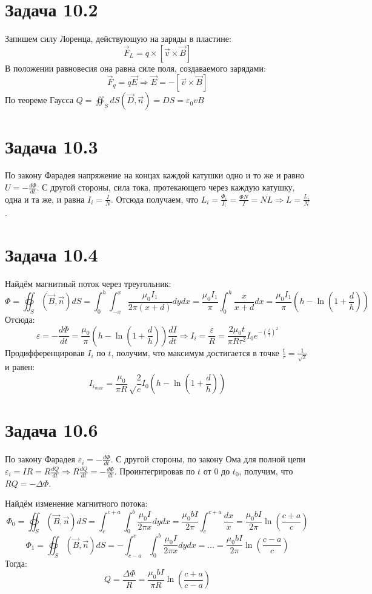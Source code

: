 \documentclass[11pt]{article}
\author{Sergey Makarov}
\date{\today}
\title{}
\begin{document}
\section{Задача 10.2}
\label{sec:org1e35823}
Запишем силу Лоренца, действующую на заряды в пластине:
$$\vec F_{L} = q \times [\vec v \times \vec B]$$
В положении равновесия она равна силе поля, создаваемого зарядами:
$$\vec F_q = q\vec E \Rightarrow \vec E = -[\vec v \times \vec B]$$
По теореме Гаусса \(Q = \oiint_SdS (\vec D, \vec n) = DS = \varepsilon_0vB\)
\section{Задача 10.3}
\label{sec:orge43d497}
По закону Фарадея напряжение на концах каждой катушки одно и то же и равно \(U = -\frac{d\Phi}{dt}\).
С другой стороны, сила тока, протекающего через каждую катушку, одна и та же, и равна \(I_i = \frac{I}{N}\).
Отсюда получаем, что \(L_i = \frac{\Phi_i}{I_i} = \frac{\Phi N}{I} = NL \Rightarrow L = \frac{L_i}{N}\).
\section{Задача 10.4}
\label{sec:orgbf37fa8}
Найдём магнитный поток через треугольник:
$$\Phi = \oiint_S (\vec B, \vec n)dS = \int_0^h \int_{-x}^x \frac{\mu_0 I_1}{2\pi(x + d)}dydx = \frac{\mu_0 I_1}{\pi}\int_0^h \frac{x}{x + d}dx = \frac{\mu_0 I_1}{\pi}\left(h - \ln\left(1 + \frac{d}{h}\right)\right)$$
Отсюда:
$$\varepsilon = -\frac{d\Phi}{dt} = \frac{\mu_0}{\pi}\left(h - \ln\left(1 + \frac{d}{h}\right)\right)\frac{dI}{dt} \Rightarrow I_{i} = \frac{\varepsilon}{R} = \frac{2\mu_0t}{\pi R\tau^2}I_0e^{-\left(\frac{t}{\tau}\right)^2}$$
Продифференцировав \(I_i\) по \(t\), получим, что максимум достигается в точке \(\frac{t}{\tau} = \frac{1}{\sqrt 2}\) и равен:
$$I_{i_{max}} = \frac{\mu_0}{\pi R}\sqrt \frac{2}{e} I_0\left(h - \ln\left(1 + \frac{d}{h}\right)\right)$$
\section{Задача 10.6}
\label{sec:org720c0a1}
По закону Фарадея \(\varepsilon_i = -\frac{d\Phi}{dt}\). С другой стороны, по закону Ома для полной цепи \(\varepsilon_i = IR = R\frac{dQ}{dt} \Rightarrow R\frac{dQ}{dt} = -\frac{d\Phi}{dt}\). Проинтегрировав по \(t\) от \(0\) до \(t_0\), получим, что \(RQ = -\Delta\Phi\).

Найдём изменение магнитного потока:
$$\Phi_0 = \oiint_S (\vec B, \vec n)dS = \int_c^{c + a} \int_0^b \frac{\mu_0 I}{2\pi x}dydx = \frac{\mu_0 bI}{2\pi}\int_c^{c + a} \frac{dx}{x} = \frac{\mu_0 bI}{2\pi}\ln\left(\frac{c + a}{c}\right)$$
$$\Phi_1 = \oiint_S (\vec B, \vec n)dS = -\int_{c - a}^c \int_0^b \frac{\mu_0 I}{2\pi x}dydx = \ldots = \frac{\mu_0 bI}{2\pi}\ln\left(\frac{c - a}{c}\right)$$
Тогда:
$$Q = \frac{\Delta\Phi}{R} = \frac{\mu_0 bI}{\pi R}\ln\left(\frac{c + a}{c - a}\right)$$
\end{document}
